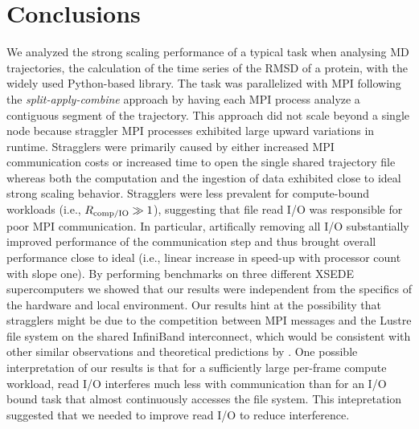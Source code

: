 
\section{Conclusions}
\label{sec:conclusions}

We analyzed the strong scaling performance of a typical task when analysing MD trajectories, the calculation of the time series of the RMSD of a protein, with the widely used Python-based  library.
The task was parallelized with MPI following the \emph{split-apply-combine} approach by having each MPI process analyze a contiguous segment of the trajectory.
This approach did not scale beyond a single node because straggler MPI processes exhibited large upward variations in runtime.
Stragglers were primarily caused by either increased MPI communication costs or increased time to open the single shared trajectory file whereas both the computation and the ingestion of data exhibited close to ideal strong scaling behavior.
Stragglers were less prevalent for compute-bound workloads (i.e., $R_{\text{comp/IO}} \gg 1$), suggesting that file read I/O was responsible for poor MPI communication.
In particular, artifically removing all I/O substantially improved performance of the communication step and thus brought overall performance close to ideal (i.e., linear increase in speed-up with processor count with slope one).
By performing benchmarks on three different XSEDE supercomputers we showed that our results were independent from the specifics of the hardware and local environment.
Our results hint at the possibility that stragglers might be due to the competition between MPI messages and the Lustre file system on the shared InfiniBand interconnect, which would be consistent with other similar observations \cite{VMD2013} and theoretical predictions by \citet{Brown:2018ab}.
One possible interpretation of our results is that for a sufficiently large per-frame compute workload, read I/O interferes much less with communication than for an I/O bound task that almost continuously accesses the file system.
This intepretation suggested that we needed to improve read I/O to reduce interference.

